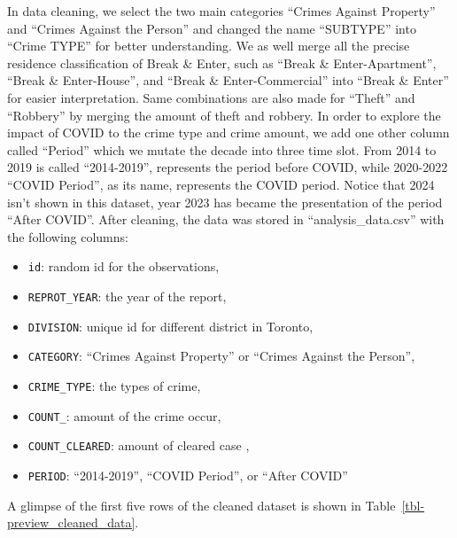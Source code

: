 \documentclass[
  letterpaper,
  DIV=11,
  numbers=noendperiod]{scrartcl}
\providecommand{\tightlist}{%
  \setlength{\itemsep}{0pt}\setlength{\parskip}{0pt}}\usepackage{longtable,booktabs,array}
\begin{document}
In data cleaning, we select the two main categories ``Crimes Against
Property'' and ``Crimes Against the Person'' and changed the name
``SUBTYPE'' into ``Crime TYPE'' for better understanding. We as well
merge all the precise residence classification of Break \& Enter, such
as ``Break \& Enter-Apartment'', ``Break \& Enter-House'', and ``Break
\& Enter-Commercial'' into ``Break \& Enter'' for easier interpretation.
Same combinations are also made for ``Theft'' and ``Robbery'' by merging
the amount of theft and robbery. In order to explore the impact of COVID
to the crime type and crime amount, we add one other column called
``Period'' which we mutate the decade into three time slot. From 2014 to
2019 is called ``2014-2019'', represents the period before COVID, while
2020-2022 ``COVID Period'', as its name, represents the COVID period.
Notice that 2024 isn't shown in this dataset, year 2023 has became the
presentation of the period ``After COVID''. After cleaning, the data was
stored in ``analysis\_data.csv'' with the following columns:

\begin{itemize}
\tightlist
\item
  \texttt{id}: random id for the observations,
\item
  \texttt{REPROT\_YEAR}: the year of the report,
\item
  \texttt{DIVISION}: unique id for different district in Toronto,
\item
  \texttt{CATEGORY}: ``Crimes Against Property'' or ``Crimes Against the
  Person'',
\item
  \texttt{CRIME\_TYPE}: the types of crime,
\item
  \texttt{COUNT\_}: amount of the crime occur,
\item
  \texttt{COUNT\_CLEARED}: amount of cleared case ,
\item
  \texttt{PERIOD}: ``2014-2019'', ``COVID Period'', or ``After COVID''
\end{itemize}

A glimpse of the first five rows of the cleaned dataset is shown in
Table~\ref{tbl-preview_cleaned_data}.
\end{document}
